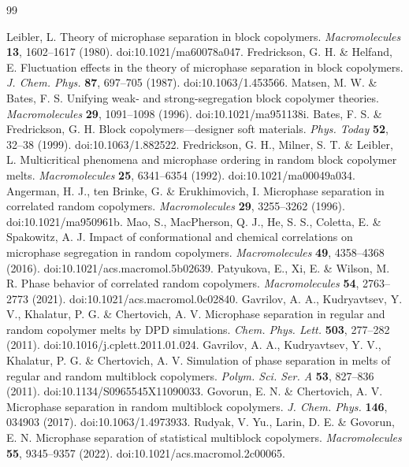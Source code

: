 \documentclass[pdflatex,sn-nature,onecolumn]{sn-jnl}
\begin{document}
\begingroup
{}
\begin{thebibliography}{99}

 Leibler, L. Theory of microphase separation in block copolymers. \textit{Macromolecules} \textbf{13}, 1602--1617 (1980). doi:10.1021/ma60078a047.
 Fredrickson, G. H. \& Helfand, E. Fluctuation effects in the theory of microphase separation in block copolymers. \textit{J. Chem. Phys.} \textbf{87}, 697--705 (1987). doi:10.1063/1.453566.
 Matsen, M. W. \& Bates, F. S. Unifying weak- and strong-segregation block copolymer theories. \textit{Macromolecules} \textbf{29}, 1091--1098 (1996). doi:10.1021/ma951138i.
 Bates, F. S. \& Fredrickson, G. H. Block copolymers---designer soft materials. \textit{Phys. Today} \textbf{52}, 32--38 (1999). doi:10.1063/1.882522.
 Fredrickson, G. H., Milner, S. T. \& Leibler, L. Multicritical phenomena and microphase ordering in random block copolymer melts. \textit{Macromolecules} \textbf{25}, 6341--6354 (1992). doi:10.1021/ma00049a034.
 Angerman, H. J., ten Brinke, G. \& Erukhimovich, I. Microphase separation in correlated random copolymers. \textit{Macromolecules} \textbf{29}, 3255--3262 (1996). doi:10.1021/ma950961b.
 Mao, S., MacPherson, Q. J., He, S. S., Coletta, E. \& Spakowitz, A. J. Impact of conformational and chemical correlations on microphase segregation in random copolymers. \textit{Macromolecules} \textbf{49}, 4358--4368 (2016). doi:10.1021/acs.macromol.5b02639.
 Patyukova, E., Xi, E. \& Wilson, M. R. Phase behavior of correlated random copolymers. \textit{Macromolecules} \textbf{54}, 2763--2773 (2021). doi:10.1021/acs.macromol.0c02840.
 Gavrilov, A. A., Kudryavtsev, Y. V., Khalatur, P. G. \& Chertovich, A. V. Microphase separation in regular and random copolymer melts by DPD simulations. \textit{Chem. Phys. Lett.} \textbf{503}, 277--282 (2011). doi:10.1016/j.cplett.2011.01.024.
 Gavrilov, A. A., Kudryavtsev, Y. V., Khalatur, P. G. \& Chertovich, A. V. Simulation of phase separation in melts of regular and random multiblock copolymers. \textit{Polym. Sci. Ser. A} \textbf{53}, 827--836 (2011). doi:10.1134/S0965545X11090033.
 Govorun, E. N. \& Chertovich, A. V. Microphase separation in random multiblock copolymers. \textit{J. Chem. Phys.} \textbf{146}, 034903 (2017). doi:10.1063/1.4973933.
 Rudyak, V. Yu., Larin, D. E. \& Govorun, E. N. Microphase separation of statistical multiblock copolymers. \textit{Macromolecules} \textbf{55}, 9345--9357 (2022). doi:10.1021/acs.macromol.2c00065.

\end{thebibliography}
\end{document}
